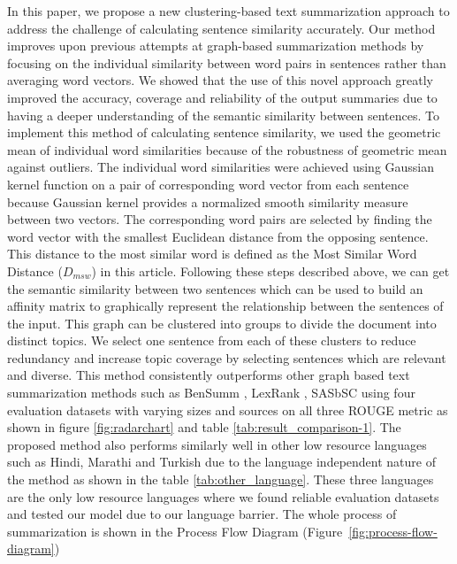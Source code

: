 In this paper, we propose a new clustering-based text summarization approach to address the challenge of calculating sentence similarity accurately. Our method improves upon previous attempts at graph-based summarization methods \cite{chowdhury-etal-2021-tfidf-clustering, roychowdhury-etal-2022-spectral-base} by focusing on the individual similarity between word pairs in sentences rather than averaging word vectors. We showed that the use of this novel approach greatly improved the accuracy, coverage and reliability of the output summaries due to having a deeper understanding of the semantic similarity between sentences. To implement this method of calculating sentence similarity, we used the geometric mean of individual word similarities because of the robustness of geometric mean against outliers. The individual word similarities were achieved using Gaussian kernel function on a pair of corresponding word vector from each sentence because Gaussian kernel provides a normalized smooth similarity measure between two vectors. The corresponding word pairs are selected by finding the word vector with the smallest Euclidean distance from the opposing sentence. This distance to the most similar word is defined as the Most Similar Word Distance ($D_{msw}$) in this article. Following these steps described above, we can get the semantic similarity between two sentences which can be used to build an affinity matrix to graphically represent the relationship between the sentences of the input. This graph can be clustered into groups to divide the document into distinct topics. We select one sentence from each of these clusters to reduce redundancy and increase topic coverage by selecting sentences which are relevant and diverse. This method consistently outperforms other graph based text summarization methods such as BenSumm \cite{chowdhury-etal-2021-tfidf-clustering}, LexRank \cite{Erkan-lexRank-2004}, SASbSC \cite{roychowdhury-etal-2022-spectral-base} using four evaluation datasets with varying sizes and sources on all three ROUGE metric \cite{lin-2004-rouge} as shown in figure \ref{fig:radarchart} and table \ref{tab:result_comparison-1}. The proposed method also performs similarly well in other low resource languages such as Hindi, Marathi and Turkish due to the language independent nature of the method as shown in the table \ref{tab:other_language}. These three languages are the only low resource languages where we found reliable evaluation datasets and tested our model due to our language barrier. The whole process of summarization is shown in the Process Flow Diagram (Figure~\ref{fig:process-flow-diagram})\\

